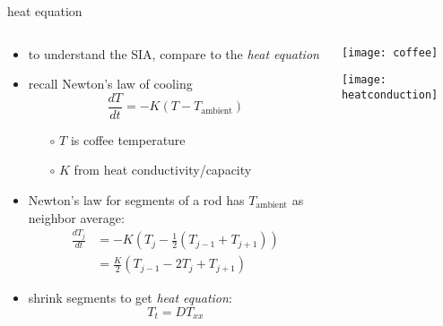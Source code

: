 \begin{frame}{heat equation}
\label{slide:heatcompare}

\small
\begin{columns}
\begin{column}{0.55\textwidth}
\begin{itemize}
\item to understand the SIA, compare to the \emph{heat equation}
\item recall Newton's law of cooling
	$$\frac{dT}{dt} = -K (T-T_{\text{ambient}})$$

  \begin{itemize}
  \item[$\circ$] $T$ is coffee temperature
  \item[$\circ$] $K$ from heat conductivity/capacity
  \end{itemize}
\item Newton's law for segments of a rod has $T_{\text{ambient}}$ as neighbor average:
\begin{align*}
\frac{dT_j}{dt} &= -K \left(T_j - \frac{1}{2} (T_{j-1} + T_{j+1}) \right) \\
	&= \frac{K}{2} \left(T_{j-1} - 2 T_j + T_{j+1}\right) 
\end{align*}
\item shrink segments to get \emph{heat equation}:
	$$T_t = D T_{xx}$$
\end{itemize}
\end{column}

\begin{column}{0.45\textwidth}
\hfill \texttt{[image: coffee]}

\vspace{13mm}
\texttt{[image: heatconduction]}
\end{column}
\end{columns}
\end{frame}


